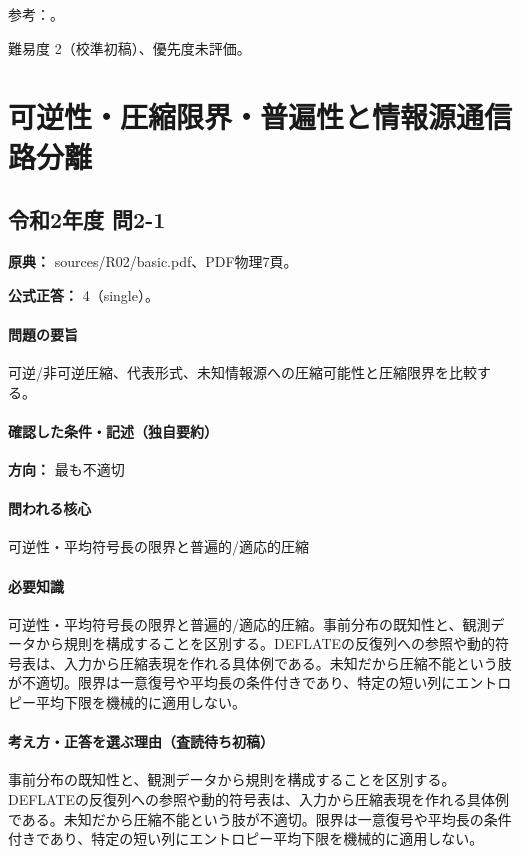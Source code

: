 \par 参考：\cite{mit_discrete2015}。

\par 難易度 2（校準初稿）、優先度未評価。

\section{可逆性・圧縮限界・普遍性と情報源通信路分離}

\subsection{令和2年度 問2-1}
\label{q:r02-reg-basic-2-1}

\noindent\textbf{原典：} sources/R02/basic.pdf、PDF物理7頁。

\textbf{公式正答：} 4（single）。

\paragraph{問題の要旨} 可逆/非可逆圧縮、代表形式、未知情報源への圧縮可能性と圧縮限界を比較する。

\paragraph{確認した条件・記述（独自要約）}\mbox{}\par

\noindent\textbf{方向：} 最も不適切\par

\paragraph{問われる核心} 可逆性・平均符号長の限界と普遍的/適応的圧縮

\paragraph{必要知識} 可逆性・平均符号長の限界と普遍的/適応的圧縮。事前分布の既知性と、観測データから規則を構成することを区別する。DEFLATEの反復列への参照や動的符号表は、入力から圧縮表現を作れる具体例である。未知だから圧縮不能という肢が不適切。限界は一意復号や平均長の条件付きであり、特定の短い列にエントロピー平均下限を機械的に適用しない。

\paragraph{考え方・正答を選ぶ理由（査読待ち初稿）} 事前分布の既知性と、観測データから規則を構成することを区別する。DEFLATEの反復列への参照や動的符号表は、入力から圧縮表現を作れる具体例である。未知だから圧縮不能という肢が不適切。限界は一意復号や平均長の条件付きであり、特定の短い列にエントロピー平均下限を機械的に適用しない。

